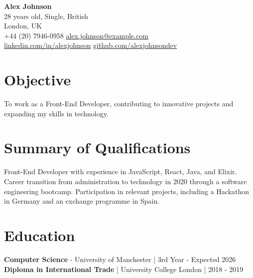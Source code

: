 \documentclass[a4paper,10pt]{article}
\begin{document}
\begin{center}
{\Huge \textbf{\textcolor{blue!80!black}{Alex Johnson}}} \\[3pt]
    28 years old, Single, British \\
    London, UK \\[5pt]
    {\faPhone*} +44 (20) 7946-0958 \quad
    {\faEnvelope} \href{mailto:alex.johnson@example.com}{alex.johnson@example.com} \\[5pt]
    {\faLinkedin} \href{https://www.linkedin.com/in/alexjohnson}{linkedin.com/in/alexjohnson} \quad
    {\faGithub} \href{https://github.com/alexjohnsondev}{github.com/alexjohnsondev}
\end{center}

\section*{Objective}
To work as a Front-End Developer, contributing to innovative projects and expanding my skills in technology.

\vspace{0.5em}

\section*{Summary of Qualifications}
Front-End Developer with experience in JavaScript, React, Java, and Elixir. Career transition from administration to technology in 2020 through a software engineering bootcamp. Participation in relevant projects, including a Hackathon in Germany and an exchange programme in Spain.

\section*{Education}
\textbf{Computer Science} - University of Manchester | 3rd Year - Expected 2026  \\
\textbf{Diploma in International Trade} | University College London | 2018 - 2019 
\end{document}
